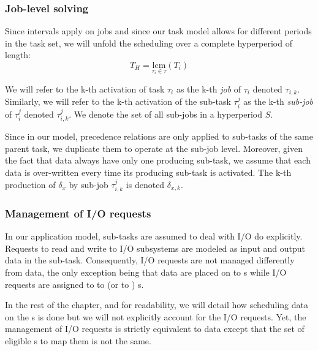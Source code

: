 \documentclass[main.tex]{subfiles}
\begin{document}
\subsubsection{Job-level solving}
Since intervals apply on jobs and since our task model allows for different periods in the task set, we will unfold the scheduling over a complete hyperperiod of length:
\begin{displaymath}
    T_H = \underset{\tau_i \in \tau}{\text{lcm}} (T_i)
\end{displaymath}

We will refer to the k-th activation of task $\tau_i$ as the k-th \emph{job} of $\tau_i$ denoted $\tau_{i,k}$. Similarly, we will refer to the k-th activation of the sub-task $\tau_i^j$ as the k-th \emph{sub-job} of $\tau_i^j$ denoted $\tau_{i,k}^j$. We denote the set of all sub-jobs in a hyperperiod $S$.

Since in our model, precedence relations are only applied to sub-tasks of the same parent task, we duplicate them to operate at the sub-job level. Moreover, given the fact that data always have only one producing sub-task, we assume that each data is over-written every time its producing sub-task is activated. The k-th production of $\delta_x$ by sub-job $\tau_{i,k}^j$ is denoted $\delta_{x,k}$.

\subsubsection{Management of I/O requests}
In our application model, sub-tasks are assumed to deal with I/O do explicitly. Requests to read and write to I/O subsystems are modeled as input and output data in the sub-task. Consequently, I/O requests are not managed differently from data, the only exception being that data are placed on \PN{} to \PN{} \PC{}s while I/O requests are assigned to \PN{} to \ION{} (or \ION{} to \PN{}) \PC{}s. 

In the rest of the chapter, and for readability, we will detail how scheduling data on the \PC{}s is done but we will not explicitly account for the I/O requests. Yet, the management of I/O requests is strictly equivalent to data except that the set of eligible \PC{}s to map them is not the same.
\end{document}

